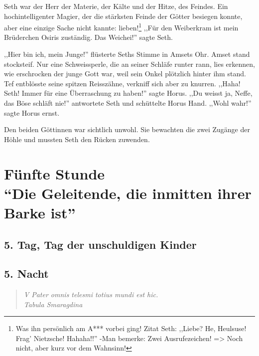 \documentclass[11pt,titlepage,a5paper]{book}
\begin{document}
Seth war der Herr der Materie, der Kälte und der Hitze, des Feindes. Ein hochintelligenter Magier, der die stärksten Feinde der Götter besiegen konnte, aber eine einzige Sache nicht kannte: lieben!\footnote{Was ihn persönlich am A*** vorbei ging! Zitat Seth: ,,Liebe? He, Heulsuse! Frag' Nietzsche! Hahaha!!'' -Man bemerke: Zwei Ausrufezeichen! => Noch nicht, aber kurz vor dem Wahnsinn!} ,,Für den Weiberkram ist mein Brüderchen Osiris zuständig. Das Weichei!'' sagte Seth.

,,Hier bin ich, mein Junge!'' flüsterte Seths Stimme in Amsets Ohr. Amset stand stocksteif. Nur eine Schweissperle, die an seiner Schläfe runter rann, lies erkennen, wie erschrocken der junge Gott war, weil sein Onkel plötzlich hinter ihm stand. Tef entblösste seine spitzen Reisszähne, verkniff sich aber zu knurren. ,,Haha! Seth! Immer für eine Überraschung zu haben!'' sagte Horus. ,,Du weisst ja, Neffe, das Böse schläft nie!'' antwortete Seth und schüttelte Horus Hand. ,,Wohl wahr!'' sagte Horus ernst.

Den beiden Göttinnen war sichtlich unwohl. Sie bewachten die zwei Zugänge der Höhle und mussten Seth den Rücken zuwenden. 










\part*{Fünfte Stunde\\"`Die Geleitende, die inmitten ihrer Barke ist"'}

\chapter*{5. Tag, Tag der unschuldigen Kinder}

\chapter*{5. Nacht}


\begin{quotation}

\emph{V Pater omnis telesmi totius mundi est hic. \\Tabula Smaragdina}

\end{quotation}
\end{document}
